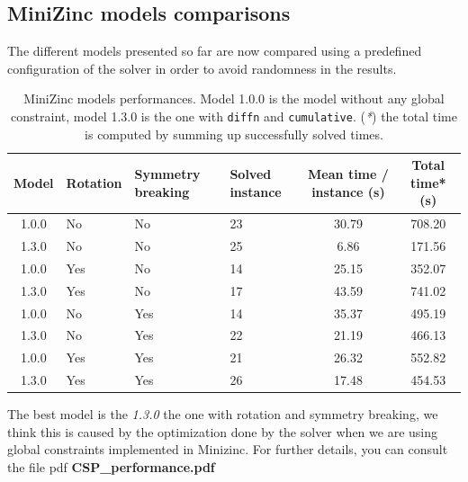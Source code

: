 \subsection{MiniZinc models comparisons}
The different models presented so far are now compared using a predefined configuration of the solver in order to avoid randomness in the results.
\\
\begin{table}[!h]
    \begin{tabular}{|c| p{2cm} | p{2 cm} | p{1.5cm} | c | c |}\hline
        Model &Rotation& Symmetry breaking& Solved instance & Mean time / instance (s) & Total time* (s) \\\hline
           1.0.0 & No  & No  & 23  & 30.79  & 708.20 \\ \hline
           1.3.0 & No  & No  & 25  & 6.86  & 171.56 \\ \hline
           1.0.0 & Yes & No  & 14  & 25.15 & 352.07 \\ \hline
           1.3.0 & Yes & No  & 17  & 43.59 & 741.02 \\ \hline
           1.0.0 & No  & Yes & 14  & 35.37  & 495.19 \\ \hline
           1.3.0 & No  & Yes & 22  & 21.19 & 466.13 \\ \hline
           1.0.0 & Yes & Yes & 21  & 26.32 & 552.82 \\ \hline
           1.3.0 & Yes & Yes & 26  & 17.48  & 454.53\\ \hline
    \end{tabular}
    \caption{MiniZinc models performances. Model 1.0.0 is the model without any global constraint, model 1.3.0 is the one with \texttt{diffn} and \texttt{cumulative}. (\emph{*}) the total time is computed by summing up successfully solved times.}
    \label{tab:csp-performance}
\end{table}

The best model is the \emph{1.3.0} the one with rotation and symmetry breaking, we think this is caused by the optimization done by the solver when we are using global constraints implemented in Minizinc. 
For further details, you can consult the file pdf \textbf{CSP\_performance.pdf}
\clearpage